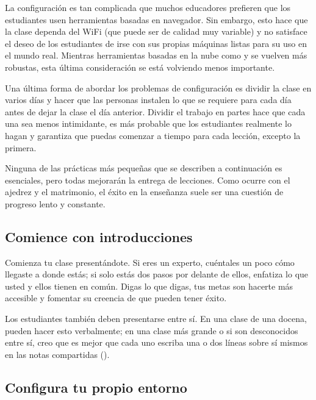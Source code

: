 La configuración es tan complicada que
muchos educadores prefieren que los estudiantes usen herramientas basadas en navegador.
Sin embargo,
esto hace que la clase dependa del WiFi
(que puede ser de calidad muy variable)
y no satisface el deseo de los estudiantes de irse con sus propias máquinas listas para su uso en el mundo real.
Mientras herramientas basadas en la nube como 
y  se vuelven más robustas,
esta última consideración se está volviendo menos importante.

Una última forma de abordar los problemas de configuración es dividir la clase en varios días
y hacer que las personas instalen lo que se requiere para cada día
antes de dejar la clase el día anterior.
Dividir el trabajo en partes hace que cada una sea menos intimidante,
es más probable que los estudiantes realmente lo hagan
y garantiza que puedas comenzar a tiempo para cada lección, excepto la primera.


Ninguna de las prácticas más pequeñas que se describen a continuación es esenciales,
pero todas mejorarán la entrega de lecciones.
Como ocurre con el ajedrez y el matrimonio,
el éxito en la enseñanza suele ser una cuestión de progreso lento y constante.

\subsection*{Comience con introducciones}

Comienza tu clase presentándote.
Si eres un experto,
cuéntales un poco cómo llegaste a donde estás;
si solo estás dos pasos por delante de ellos,
enfatiza lo que usted y ellos tienen en común.
Digas lo que digas,
tus metas son hacerte más accesible
y fomentar su creencia de que pueden tener éxito.

Los estudiantes también deben presentarse entre sí.
En una clase de una docena,
pueden hacer esto verbalmente;
en una clase más grande o si son desconocidos entre sí,
creo que es mejor que cada uno escriba una o dos líneas sobre sí mismos en las notas compartidas ().

\subsection*{Configura tu propio entorno}

